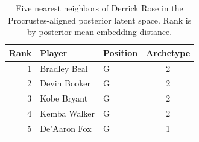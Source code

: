 \begin{table}[htbp]
  \centering\small
  \begin{tabular}{rllc}
    \toprule
    Rank & Player & Position & Archetype \\
    \midrule
    1 & Bradley Beal & G & 2 \\
    2 & Devin Booker & G & 2 \\
    3 & Kobe Bryant & G & 2 \\
    4 & Kemba Walker & G & 2 \\
    5 & De'Aaron Fox & G & 1 \\
    \bottomrule
  \end{tabular}
  \caption{Five nearest neighbors of Derrick Rose in the Procrustes-aligned posterior latent space. Rank is by posterior mean embedding distance.}
  \label{tab:Derrick_Rose_neighbors}
\end{table}

